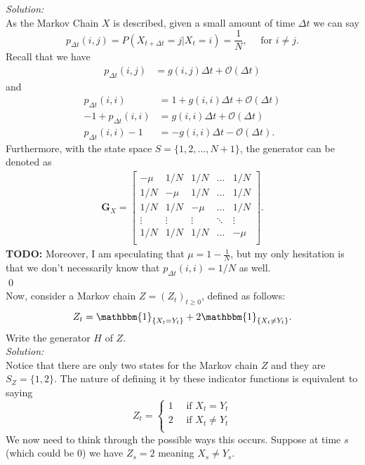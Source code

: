 \documentclass[10pt]{amsart}
\begin{document}
\noindent
\textit{Solution:} \\
As the Markov Chain $X$ is described, given a small amount of time $\Delta t$ we can say 
$$
p_{\Delta t}(i,j) = P(X_{t + \Delta t} = j | X_t = i) = \frac 1 N, \quad \text{ for } i \neq j.
$$
Recall that we have
\begin{align*}
p_{\Delta t}(i, j) &= g(i, j) \Delta t + \mathcal O(\Delta t)
\end{align*}
and
\begin{align*}
p_{\Delta t}(i, i) &= 1 + g(i, i) \Delta t + \mathcal O(\Delta t) \\
- 1 + p_{\Delta t}(i, i) &= g(i, i) \Delta t + \mathcal O(\Delta t) \\
p_{\Delta t}(i, i) - 1 &= - g(i, i) \Delta t - \mathcal O(\Delta t).
\end{align*}
Furthermore, with the state space $S = \{1, 2, ..., N + 1\}$, the generator can be denoted as
\begin{align*}
\bm G_X = 
\begin{bmatrix}
- \mu & 1/N & 1/N & \dots & 1/N \\
1/N & - \mu & 1/N & \dots & 1/N \\
1/N & 1/N & - \mu & \dots & 1/N \\
\vdots & \vdots & \vdots & \ddots & \vdots \\
1/N & 1/N & 1/N & \dots & - \mu \\
\end{bmatrix}.
\end{align*}
\textbf{TODO:}
Moreover, I am speculating that $\mu = 1 - \frac 1 N$, but my only hesitation is that we don't necessarily know that $p_{\Delta t}(i,i) = 1/N$ as well. \\
\qed \\


 Now, consider a Markov chain $Z=(Z_t)_{t\geq0}$, defined as follows:
$$Z_t=\mathbbm{1}_{\{X_t=Y_t\}}+2 \mathbbm{1}_{\{X_t\neq Y_t\}}.$$
Write the generator $H$ of $Z$. \\

\noindent
\textit{Solution: } \\
Notice that there are only two states for the Markov chain $Z$ and they are $S_Z = \{1, 2\}$.
The nature of defining it by these indicator functions is equivalent to saying
$$
Z_t = \begin{cases}
1 \quad \text{ if } X_t = Y_t\\
2 \quad \text{ if } X_t \neq Y_t\\
\end{cases}
$$
We now need to think through the possible ways this occurs.
Suppose at time $s$ (which could be $0$) we have $Z_s = 2$ meaning $X_s \neq Y_s$. \\
\end{document}
